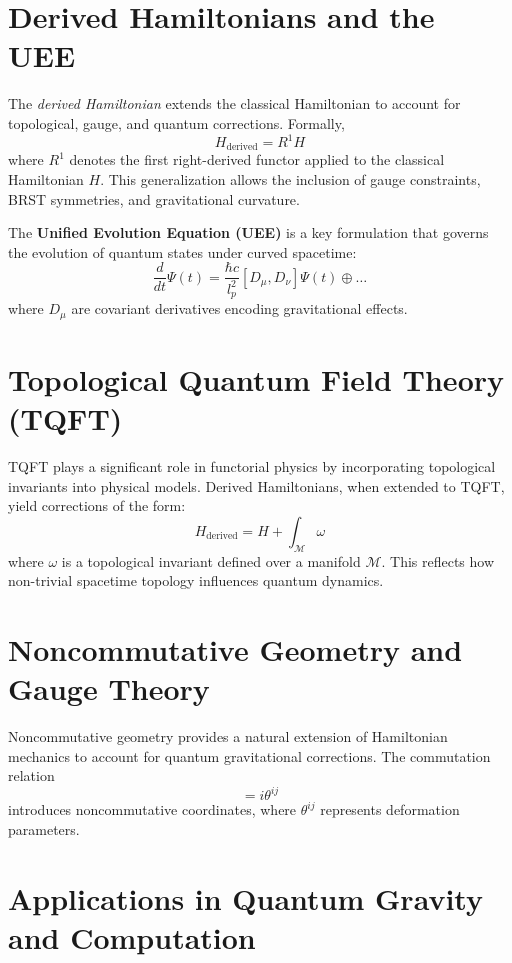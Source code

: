 \documentclass[12pt]{article}
\begin{document}
\section{Derived Hamiltonians and the UEE}
The \textit{derived Hamiltonian} extends the classical Hamiltonian to account for topological, gauge, and quantum corrections. Formally,
\begin{equation}
H_{\text{derived}} = R^1 H
\end{equation}
where \( R^1 \) denotes the first right-derived functor applied to the classical Hamiltonian \( H \). This generalization allows the inclusion of gauge constraints, BRST symmetries, and gravitational curvature.

The \textbf{Unified Evolution Equation (UEE)} is a key formulation that governs the evolution of quantum states under curved spacetime:
\begin{equation}
\frac{d}{dt}\Psi(t) = \frac{\hbar c}{l_p^2} [D_\mu, D_\nu] \Psi(t) \oplus \dots
\end{equation}
where \( D_\mu \) are covariant derivatives encoding gravitational effects.

\section{Topological Quantum Field Theory (TQFT)}
TQFT plays a significant role in functorial physics by incorporating topological invariants into physical models. Derived Hamiltonians, when extended to TQFT, yield corrections of the form:
\begin{equation}
H_{\text{derived}} = H + \int_{\mathcal{M}} \omega
\end{equation}
where \( \omega \) is a topological invariant defined over a manifold \( \mathcal{M} \). This reflects how non-trivial spacetime topology influences quantum dynamics.

\section{Noncommutative Geometry and Gauge Theory}
Noncommutative geometry provides a natural extension of Hamiltonian mechanics to account for quantum gravitational corrections. The commutation relation
\begin{equation}
[X^i, X^j] = i \theta^{ij}
\end{equation}
introduces noncommutative coordinates, where \( \theta^{ij} \) represents deformation parameters.

\section{Applications in Quantum Gravity and Computation}
\end{document}

